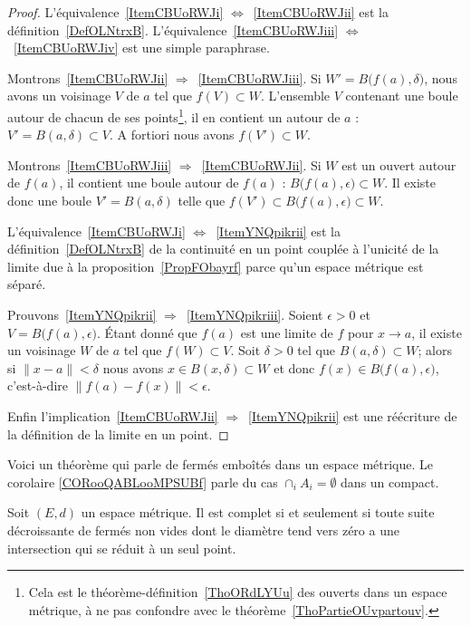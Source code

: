 \begin{proof}
    L'équivalence~\ref{ItemCBUoRWJi} \( \Leftrightarrow\)~\ref{ItemCBUoRWJii} est la définition~\ref{DefOLNtrxB}. L'équivalence~\ref{ItemCBUoRWJiii} \( \Leftrightarrow\)~\ref{ItemCBUoRWJiv} est une simple paraphrase.

    Montrons~\ref{ItemCBUoRWJii} \( \Rightarrow\)~\ref{ItemCBUoRWJiii}. Si \( W'=B\big( f(a),\delta \big)\), nous avons un voisinage \( V\) de \( a\) tel que \( f(V)\subset W\). L'ensemble \( V\) contenant une boule autour de chacun de ses points\footnote{Cela est le théorème-définition~\ref{ThoORdLYUu} des ouverts dans un espace métrique, à ne pas confondre avec le théorème~\ref{ThoPartieOUvpartouv}.}, il en contient un autour de \( a\) : \( V'=B(a,\delta)\subset V\). A fortiori nous avons \( f(V')\subset W\).

    Montrons~\ref{ItemCBUoRWJiii} \( \Rightarrow\)~\ref{ItemCBUoRWJii}. Si \( W\) est un ouvert autour de \( f(a)\), il contient une boule autour de \( f(a)\) : \( B\big( f(a),\epsilon \big)\subset W\). Il existe donc une boule \( V'=B(a,\delta)\) telle que \( f(V')\subset B\big( f(a),\epsilon \big)\subset W\).

    L'équivalence~\ref{ItemCBUoRWJi} \( \Leftrightarrow\)~\ref{ItemYNQpikrii} est la définition~\ref{DefOLNtrxB} de la continuité en un point couplée à l'unicité de la limite due à la proposition~\ref{PropFObayrf} parce qu'un espace métrique est séparé.

    Prouvons~\ref{ItemYNQpikrii} \( \Rightarrow\)~\ref{ItemYNQpikriii}. Soient \( \epsilon>0\) et \( V=B\big( f(a),\epsilon \big)\). Étant donné que \( f(a)\) est une limite de \( f\) pour \( x\to a\), il existe un voisinage \( W\) de \( a\) tel que \( f(W)\subset V\). Soit \( \delta>0\) tel que \( B(a,\delta)\subset W\); alors si \( \| x-a \|<\delta\) nous avons \( x\in B(x,\delta)\subset W\) et donc \( f(x)\in B\big( f(a),\epsilon \big)\), c'est-à-dire \( \| f(a)-f(x) \|<\epsilon\).

    Enfin l'implication~\ref{ItemCBUoRWJii} \( \Rightarrow\)~\ref{ItemYNQpikrii} est une réécriture de la définition de la limite en un point.
\end{proof}

Voici un théorème qui parle de fermés emboîtés dans un espace métrique. Le corolaire \ref{CORooQABLooMPSUBf} parle du cas \( \cap_iA_i=\emptyset\) dans un compact.

\begin{theorem}   \label{ThoCQAcZxX}
    Soit \( (E,d)\) un espace métrique. Il est complet si et seulement si toute suite décroissante de fermés non vides dont le diamètre tend vers zéro a une intersection qui se réduit à un seul point.
\end{theorem}

